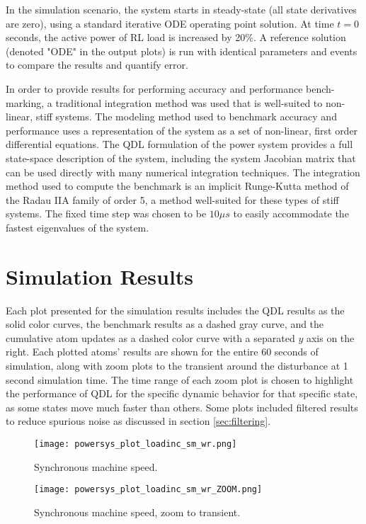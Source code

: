 In the simulation scenario, the system starts in steady-state (all state derivatives are zero), using a standard iterative ODE operating point solution. At time $t=0$ seconds, the active power of RL load is increased by 20\%. A reference solution (denoted "ODE" in the output plots) is run with identical parameters and events to compare the results and quantify error. 

In order to provide results for performing accuracy and performance bench-marking, a traditional integration method was used that is well-suited to non-linear, stiff systems. The modeling method used to benchmark accuracy  and performance uses a representation of the system as a set of non-linear, first order differential equations. The QDL formulation of the power system provides a full state-space description of the system, including the system Jacobian matrix that can be used directly with many numerical integration techniques. The integration method used to compute the benchmark is an implicit Runge-Kutta method of the Radau IIA family of order 5, a method well-suited for these types of stiff systems. The fixed time step was chosen to be $10 \mu s$ to easily accommodate the fastest eigenvalues of the system.

\section{Simulation Results}

Each plot presented for the simulation results includes the QDL results as the solid color curves, the benchmark results as a dashed gray curve, and the cumulative atom updates as a dashed color curve with a separated $y$ axis on the right. Each plotted atoms' results are shown for the entire 60 seconds of simulation, along with zoom plots to the transient around the disturbance at 1 second simulation time. The time range of each zoom plot is chosen to highlight the performance of QDL for the specific dynamic behavior for that specific state, as some states move much faster than others. Some plots included filtered results to reduce spurious noise as discussed in section \ref{sec:filtering}.

\begin{figure}[h]
    \centering
    \texttt{[image: powersys\_plot\_loadinc\_sm\_wr.png]}
    \caption{Synchronous machine speed.}
    \label{fig:powersys_plot_loadinc_sm_wr}
\end{figure}

\begin{figure}[h]
    \centering
    \texttt{[image: powersys\_plot\_loadinc\_sm\_wr\_ZOOM.png]}
    \caption{Synchronous machine speed, zoom to transient.}
    \label{fig:powersys_plot_loadinc_sm_wr_ZOOM}
\end{figure}

